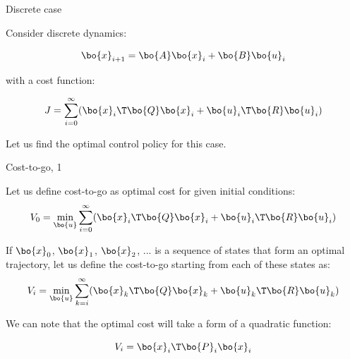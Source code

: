 \documentclass{beamer}
\begin{document}
\begin{frame}{Discrete case}
	\begin{flushleft}
		
		Consider discrete dynamics:
		
		\begin{equation}
			\bo{x}_{i+1} = \bo{A}\bo{x}_i + \bo{B}\bo{u}_i
		\end{equation}
		
		with a cost function:
		
		\begin{equation}
			J = \sum_{i=0}^\infty (\bo{x}_i\T \bo{Q} \bo{x}_i +  \bo{u}_i\T \bo{R} \bo{u}_i)
		\end{equation}
		
		Let us find the optimal control policy for this case.
		
		
	\end{flushleft}
\end{frame}



\begin{frame}{Cost-to-go, 1}
	\begin{flushleft}
		
		Let us define cost-to-go as optimal cost for given initial conditions:
		\begin{equation}
			V_0 = \underset{\bo{u}}{\text{min}} \sum_{i=0}^\infty (\bo{x}_i\T \bo{Q} \bo{x}_i +  \bo{u}_i\T \bo{R} \bo{u}_i)
		\end{equation}
		
		If $\bo{x}_0$, $\bo{x}_1$, $\bo{x}_2$, ... is a sequence of states that form an optimal trajectory, let us define the cost-to-go starting from each of these states as:
		\begin{equation}
			V_i =  \underset{\bo{u}}{\text{min}} \sum_{k = i}^\infty (\bo{x}_k\T \bo{Q} \bo{x}_k +  \bo{u}_k\T \bo{R} \bo{u}_k)
		\end{equation}
		
		We can note that the optimal cost will take a form of a quadratic function:
		
		\begin{equation}
			V_i = \bo{x}_i\T \bo{P}_i \bo{x}_i
		\end{equation}
		
		
		
	\end{flushleft}
\end{frame}
\end{document}
